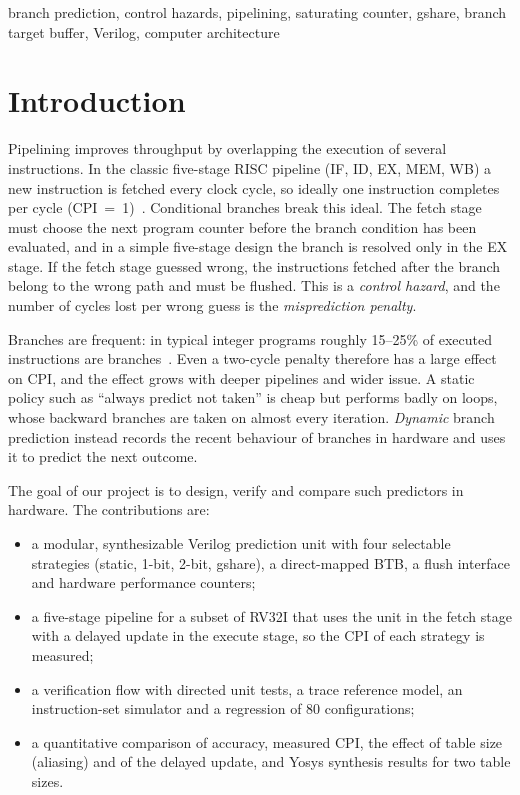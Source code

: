 \documentclass[conference]{IEEEtran}
\begin{document}
\begin{IEEEkeywords}
branch prediction, control hazards, pipelining, saturating counter, gshare, branch target
buffer, Verilog, computer architecture
\end{IEEEkeywords}

\section{Introduction}
Pipelining improves throughput by overlapping the execution of several instructions. In the
classic five-stage RISC pipeline (IF, ID, EX, MEM, WB) a new instruction is fetched every clock
cycle, so ideally one instruction completes per cycle (CPI~=~1)~\cite{patterson2020}.
Conditional branches break this ideal. The fetch stage must choose the next program counter
before the branch condition has been evaluated, and in a simple five-stage design the branch is
resolved only in the EX stage. If the fetch stage guessed wrong, the instructions fetched after
the branch belong to the wrong path and must be flushed. This is a \emph{control hazard}, and the
number of cycles lost per wrong guess is the \emph{misprediction penalty}.

Branches are frequent: in typical integer programs roughly 15--25\% of executed instructions are
branches~\cite{hennessy2017}. Even a two-cycle penalty therefore has a large effect on CPI, and
the effect grows with deeper pipelines and wider issue. A static policy such as ``always predict
not taken'' is cheap but performs badly on loops, whose backward branches are taken on almost
every iteration. \emph{Dynamic} branch prediction instead records the recent behaviour of
branches in hardware and uses it to predict the next outcome.

The goal of our project is to design, verify and compare such predictors in hardware. The
contributions are:
\begin{itemize}
\item a modular, synthesizable Verilog prediction unit with four selectable strategies (static,
1-bit, 2-bit, gshare), a direct-mapped BTB, a flush interface and hardware performance counters;
\item a five-stage pipeline for a subset of RV32I that uses the unit in the fetch stage with a
delayed update in the execute stage, so the CPI of each strategy is measured;
\item a verification flow with directed unit tests, a trace reference model, an instruction-set
simulator and a regression of 80 configurations;
\item a quantitative comparison of accuracy, measured CPI, the effect of table size (aliasing)
and of the delayed update, and Yosys synthesis results for two table sizes.
\end{itemize}
\end{document}
